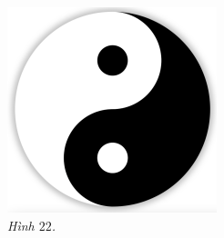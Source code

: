 \begin{multicols}{2}
\begin{figure}[H]
		\includegraphics[height= 0.45\linewidth]{22d}
		\caption{\small\textit{\color{toancuabi}Hình $22$.}}
		\vspace*{-10pt}
	\end{figure}
\end{multicols}
%
